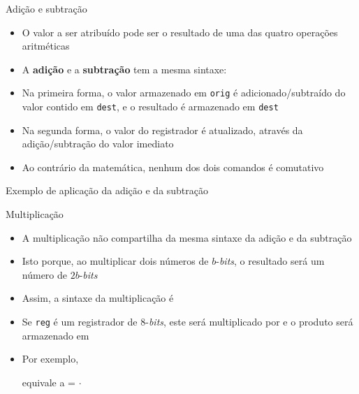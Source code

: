 \begin{frame}[fragile]{Adição e subtração}

    \begin{itemize}
        \item O valor a ser atribuído pode ser o resultado de uma das quatro operações
            aritméticas

        \item A \textbf{adição} e a \textbf{subtração} tem a mesma sintaxe:

        \item Na primeira forma, o valor armazenado em \texttt{orig} é adicionado/subtraído do
            valor contido em \texttt{dest}, e o resultado é armazenado em \texttt{dest}

        \item Na segunda forma, o valor do registrador é atualizado, através da adição/subtração
            do valor imediato

        \item Ao contrário da matemática, nenhum dos dois comandos é comutativo
    \end{itemize}

\end{frame}

\begin{frame}[fragile]{Exemplo de aplicação da adição e da subtração}
\end{frame}

\begin{frame}[fragile]{Multiplicação}

    \begin{itemize}
        \item A multiplicação não compartilha da mesma sintaxe da adição e da subtração

        \item Isto porque, ao multiplicar dois números de $b$-\textit{bits}, o resultado será um
            número de $2b$-\textit{bits}

        \item Assim, a sintaxe da multiplicação é


        \item Se \texttt{reg} é um registrador de 8-\textit{bits}, este será multiplicado por
             e o produto será armazenado em 

        \item Por exemplo,


        equivale a  = $\cdot$
    \end{itemize}

\end{frame}

